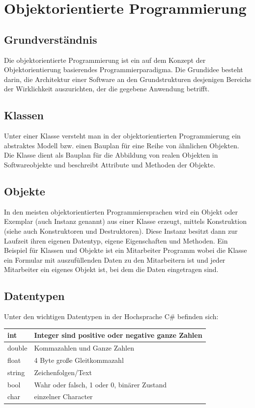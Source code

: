 \documentclass[12pt,a4paper]{article}
\begin{document}
\section{Objektorientierte Programmierung}

\subsection{Grundverständnis}
    Die objektorientierte Programmierung ist ein auf dem Konzept der Objektorientierung basierendes
    Programmierparadigma. Die Grundidee besteht darin, die Architektur einer Software an den Grundstrukturen desjenigen
    Bereichs der Wirklichkeit auszurichten, der die gegebene Anwendung betrifft.

\subsection{Klassen}
    Unter einer Klasse versteht man in der objektorientierten Programmierung ein abstraktes Modell bzw. einen Bauplan für eine Reihe von ähnlichen Objekten. Die Klasse dient als Bauplan für die Abbildung von realen Objekten in Softwareobjekte und beschreibt Attribute und Methoden der Objekte.

\subsection{Objekte}
    In den meisten objektorientierten Programmiersprachen wird ein Objekt oder Exemplar (auch Instanz genannt) aus einer Klasse erzeugt, mittels Konstruktion (siehe auch Konstruktoren und Destruktoren). Diese Instanz besitzt dann zur Laufzeit ihren eigenen Datentyp, eigene Eigenschaften und Methoden. Ein Beispiel für Klassen und Objekte ist ein Mitarbeiter Programm wobei die Klasse ein Formular mit auszufüllenden Daten zu den Mitarbeitern ist und jeder Mitarbeiter ein eigenes Objekt ist, bei dem die Daten eingetragen sind.

\subsection{Datentypen}
    Unter den wichtigen Datentypen in der Hochsprache C\# befinden sich:
    \begin{table}[h]
        \centering
        \begin{tabularx}{17cm}{|X|X|}
            \hline
            int & Integer sind positive oder negative ganze Zahlen\\
            \hline
            double & Kommazahlen und Ganze Zahlen\\
            \hline
            float & 4 Byte große Gleitkommazahl\\
            \hline
            string & Zeichenfolgen/Text\\
            \hline
            bool & Wahr oder falsch, 1 oder 0, binärer Zustand\\
            \hline
            char & einzelner Character\\
            \hline
        \end{tabularx}
    \end{table}
\end{document}
